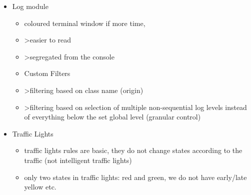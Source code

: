 \begin{itemize}
    \item Log module
    \begin{itemize}
        \item coloured terminal window if more time,
        \item >easier to read
        \item >segregated from the console
        \item Custom Filters
        \item >filtering based on class name (origin)
        \item >filtering based on selection of multiple non-sequential log levels instead of everything below the set global level (granular control)
    \end{itemize}

     \item Traffic Lights
     \begin{itemize}
        \item traffic lights rules are basic, they do not change states according to the traffic (not intelligent traffic lights)
        \item only two states in traffic lights: red and green, we do not have early/late yellow etc.
     \end{itemize}
\end{itemize}


